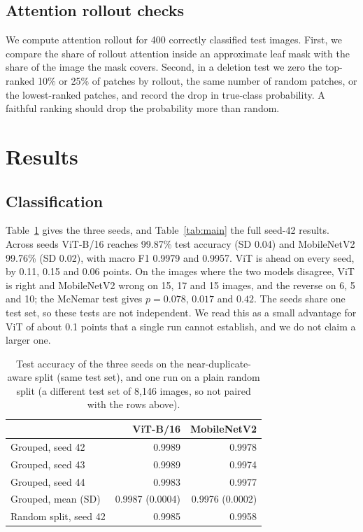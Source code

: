 \documentclass[conference]{IEEEtran}
\begin{document}
\subsection{Attention rollout checks}
We compute attention rollout \cite{abnar2020rollout} for 400 correctly classified test images. First, we compare the share of rollout attention inside an approximate leaf mask with the share of the image the mask covers. Second, in a deletion test we zero the top-ranked 10\% or 25\% of patches by rollout, the same number of random patches, or the lowest-ranked patches, and record the drop in true-class probability. A faithful ranking should drop the probability more than random.

\section{Results}
\subsection{Classification}
Table~\ref{tab:seeds} gives the three seeds, and Table~\ref{tab:main} the full seed-42 results. Across seeds ViT-B/16 reaches 99.87\% test accuracy (SD 0.04) and MobileNetV2 99.76\% (SD 0.02), with macro F1 0.9979 and 0.9957. ViT is ahead on every seed, by 0.11, 0.15 and 0.06 points. On the images where the two models disagree, ViT is right and MobileNetV2 wrong on 15, 17 and 15 images, and the reverse on 6, 5 and 10; the McNemar test gives $p=0.078$, $0.017$ and $0.42$. The seeds share one test set, so these tests are not independent. We read this as a small advantage for ViT of about 0.1 points that a single run cannot establish, and we do not claim a larger one.

\begin{table}[t]
\caption{Test accuracy of the three seeds on the near-duplicate-aware split (same test set), and one run on a plain random split (a different test set of 8,146 images, so not paired with the rows above).}
\label{tab:seeds}
\centering
\small
\begin{tabular}{lrr}
\toprule
 & ViT-B/16 & MobileNetV2 \\
\midrule
Grouped, seed 42 & 0.9989 & 0.9978 \\
Grouped, seed 43 & 0.9989 & 0.9974 \\
Grouped, seed 44 & 0.9983 & 0.9977 \\
Grouped, mean (SD) & 0.9987 (0.0004) & 0.9976 (0.0002) \\
\midrule
Random split, seed 42 & 0.9985 & 0.9958 \\
\bottomrule
\end{tabular}
\end{table}
\end{document}
